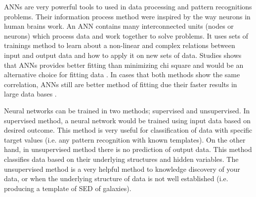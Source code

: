 ANNs are very powerful tools to used in data processing and pattern recognitions problems.
Their information process method were inspired by the way neurons in human brains work.
An ANN contains many interconnected units (nodes or neurons) which process data and work together to solve problems.
It uses sets of trainings method to learn about a non-linear and complex relations between input and output data and how to apply it on new sets of data.
Studies shows that ANNs provides better fitting than minimizing chi square and would be an alternative choice for fitting data \citep[e.g.][]{Marquez91,Moayed09}.
In cases that both methods show the same correlation, ANNs still are better method of fitting due their faster results in large data bases \citep[][]{Gulati97}.

Neural networks can be trained in two methods; supervised and unsupervised.
In supervised method, a neural network would be trained using input data based on desired outcome.
This method is very useful for classification of data with specific target values (i.e. any pattern recognition with known templates).
On the other hand, in unsupervised method there is no prediction of output data.
This method classifies data based on their underlying structures and hidden variables.
The unsupervised method is a very helpful method to knowledge discovery of your data, or when the underlying structure of data is not well established (i.e. producing a template of SED of galaxies).

